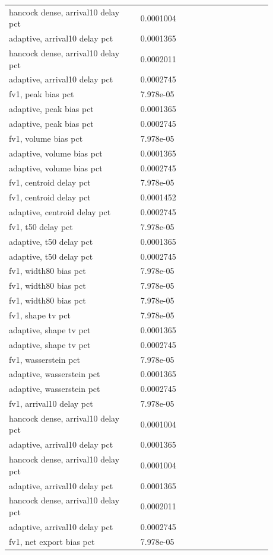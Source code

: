 \begin{longtable}{p{0.4400\linewidth}p{0.4400\linewidth}}
hancock dense, arrival10 delay pct & 0.0001004 \\
adaptive, arrival10 delay pct & 0.0001365 \\
hancock dense, arrival10 delay pct & 0.0002011 \\
adaptive, arrival10 delay pct & 0.0002745 \\
fv1, peak bias pct & 7.978e-05 \\
adaptive, peak bias pct & 0.0001365 \\
adaptive, peak bias pct & 0.0002745 \\
fv1, volume bias pct & 7.978e-05 \\
adaptive, volume bias pct & 0.0001365 \\
adaptive, volume bias pct & 0.0002745 \\
fv1, centroid delay pct & 7.978e-05 \\
fv1, centroid delay pct & 0.0001452 \\
adaptive, centroid delay pct & 0.0002745 \\
fv1, t50 delay pct & 7.978e-05 \\
adaptive, t50 delay pct & 0.0001365 \\
adaptive, t50 delay pct & 0.0002745 \\
fv1, width80 bias pct & 7.978e-05 \\
fv1, width80 bias pct & 7.978e-05 \\
fv1, width80 bias pct & 7.978e-05 \\
fv1, shape tv pct & 7.978e-05 \\
adaptive, shape tv pct & 0.0001365 \\
adaptive, shape tv pct & 0.0002745 \\
fv1, wasserstein pct & 7.978e-05 \\
adaptive, wasserstein pct & 0.0001365 \\
adaptive, wasserstein pct & 0.0002745 \\
fv1, arrival10 delay pct & 7.978e-05 \\
hancock dense, arrival10 delay pct & 0.0001004 \\
adaptive, arrival10 delay pct & 0.0001365 \\
hancock dense, arrival10 delay pct & 0.0001004 \\
adaptive, arrival10 delay pct & 0.0001365 \\
hancock dense, arrival10 delay pct & 0.0002011 \\
adaptive, arrival10 delay pct & 0.0002745 \\
fv1, net export bias pct & 7.978e-05 \\

\end{longtable}
